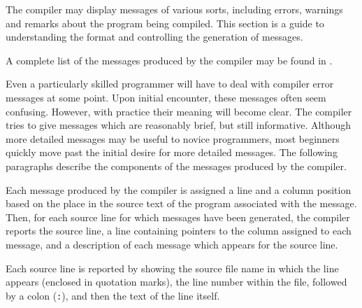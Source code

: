 \newcommand{\mysubhead}[1]{\vskip -2mm {$\bullet$ \bf #1}}
\newcommand{\mysubcont}[1]{\vskip -2mm \hspace{1.9mm} {\bf #1}}
\newcommand{\Dos}[0]{DOS} %
%
%

The \asharp{} compiler may display messages of various sorts, including
errors, warnings and remarks about the program being compiled.
This section is a guide to understanding the format and controlling the 
generation of \asharp{} messages.

A complete list of the messages produced by the compiler
may be found in .


Even a particularly skilled programmer will have to deal with compiler
error messages at some point.  Upon initial encounter, these messages
often seem confusing.  However, with practice their meaning will
become clear.  The \asharp{} compiler tries to give messages which are
reasonably brief, but still informative.  Although more detailed
messages may be useful to novice programmers, most beginners quickly
move past the initial desire for more detailed messages.  The
following paragraphs describe the components of the messages produced
by the \asharp{} compiler.


Each message produced by the \asharp{} compiler is assigned a line and
a column position based on the place in the source text of the program
associated with the message.
Then, for each source line for which messages have been generated, the
compiler reports the source line, a line containing pointers to the
column assigned to each message, and a description of each message
which appears for the source line.

Each source line is reported by showing the source file name in which the
line appears (enclosed in quotation marks), the line number within the
file, followed by a colon (\verb":"), and then the text of the line itself.

